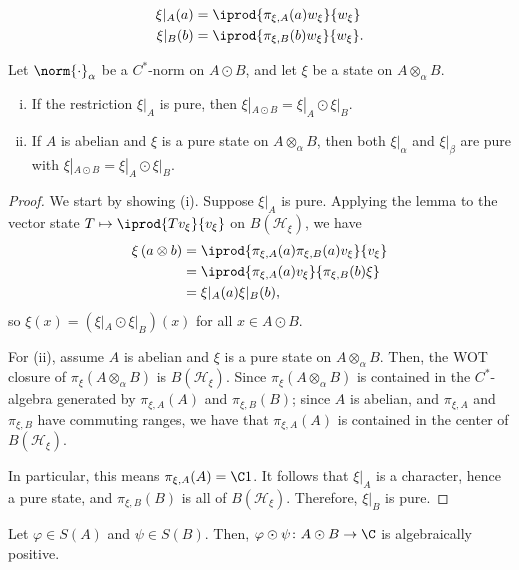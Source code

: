 \documentclass[10pt]{mypackage}
\begin{document}
\begin{align*}
  \xi|_{A}(a) &= \iprod{\pi_{\xi,A}(a)w_{\xi}}{w_{\xi}}\\
  \xi|_{B}(b) &= \iprod{\pi_{\xi,B}(b)w_{\xi}}{w_{\xi}}.
\end{align*}
\begin{proposition}
  Let $\norm{\cdot}_{\alpha}$ be a $C^{\ast}$-norm on $A\odot B$, and let $\xi$ be a state on $A\otimes_{\alpha}B$.
  \begin{enumerate}[(i)]
    \item If the restriction $\xi|_{A}$ is pure, then $\xi|_{A\odot B} = \xi|_A\odot \xi|_{B}$.
    \item If $A$ is abelian and $\xi$ is a pure state on $A\otimes_{\alpha}B$, then both $\xi|_{\alpha}$ and $\xi|_{\beta}$ are pure with $\xi|_{A\odot B} = \xi|_{A}\odot \xi|_{B}$.
  \end{enumerate}
\end{proposition}
\begin{proof}
We start by showing (i). Suppose $\xi|_{A}$ is pure. Applying the lemma to the vector state $ T\mapsto \iprod{Tv_{\xi}}{v_{\xi}} $ on $B\left( \mathcal{H}_{\xi} \right)$, we have
\begin{align*}
  \xi\left( a\otimes b \right) &= \iprod{\pi_{\xi,A}(a)\pi_{\xi,B}(a)v_{\xi}}{v_{\xi}}\\
                               &= \iprod{\pi_{\xi,A}(a)v_{\xi}}{\pi_{\xi,B}(b)\xi}\\
                               &= \xi|_{A}(a)\xi|_{B}(b),
\end{align*}
so $\xi(x) = \left( \xi|_{A}\odot \xi|_{B} \right)(x)$ for all $x\in A\odot B$.

For (ii), assume $A$ is abelian and $\xi$ is a pure state on $A\otimes_{\alpha}B$. Then, the WOT closure of $\pi_{\xi}\left( A\otimes_{\alpha}B \right)$ is $B\left( \mathcal{H}_{\xi} \right)$. Since $\pi_{\xi}\left( A\otimes_{\alpha}B \right)$ is contained in the $C^{\ast}$-algebra generated by $\pi_{\xi,A}(A)$ and $\pi_{\xi,B}(B)$; since $A$ is abelian, and $\pi_{\xi,A}$ and $\pi_{\xi,B}$ have commuting ranges, we have that $\pi_{\xi,A}(A)$ is contained in the center of $B\left( \mathcal{H}_{\xi} \right)$.

In particular, this means $\pi_{\xi,A}(A) = \C 1$. It follows that $\xi|_{A}$ is a character, hence a pure state, and $\pi_{\xi,B}(B)$ is all of $B\left( \mathcal{H}_{\xi} \right)$. Therefore, $\xi|_{B}$ is pure.
\end{proof}
\begin{lemma}
  Let $\varphi\in S(A)$ and $\psi\in S(B)$. Then, $\varphi\odot\psi\colon A\odot B\rightarrow \C$ is algebraically positive.
\end{lemma}
\end{document}
